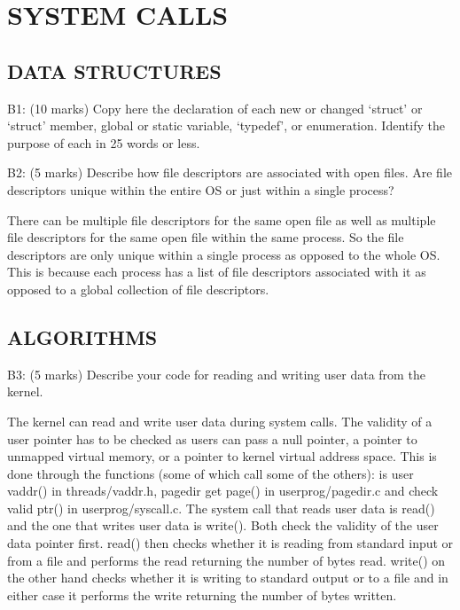 \section{SYSTEM CALLS}

\subsection*{DATA STRUCTURES}

\noindent B1: (10 marks)
Copy here the declaration of each new or changed `struct' or
`struct' member, global or static variable, `typedef', or
enumeration.  Identify the purpose of each in 25 words or less.




\noindent B2: (5 marks)
Describe how file descriptors are associated with open files.
Are file descriptors unique within the entire OS or just within a
single process?


There can be multiple file descriptors for the same open file as well as multiple file descriptors for the same open file within the same process. So the file descriptors are only unique within a single process as opposed to the whole OS. This is because each process has a list of file descriptors associated with it as opposed to a global collection of file descriptors.


\subsection*{ALGORITHMS}

\noindent B3: (5 marks)
Describe your code for reading and writing user data from the
kernel.


The kernel can read and write user data during system calls. The validity of a user pointer has to be checked as users can pass a null pointer, a pointer to unmapped virtual memory, or a pointer to kernel virtual address space. This is done through the functions (some of which call some of the others): is user vaddr() in threads/vaddr.h, pagedir get page() in userprog/pagedir.c and check valid ptr() in userprog/syscall.c. The system call that reads user data is read() and the one that writes user data is write(). Both check the validity of the user data pointer first. read() then checks whether it is reading from standard input or from a file and performs the read returning the number of bytes read. write() on the other hand checks whether it is writing to standard output or to a file and in either case it performs the write returning the number of bytes written.

